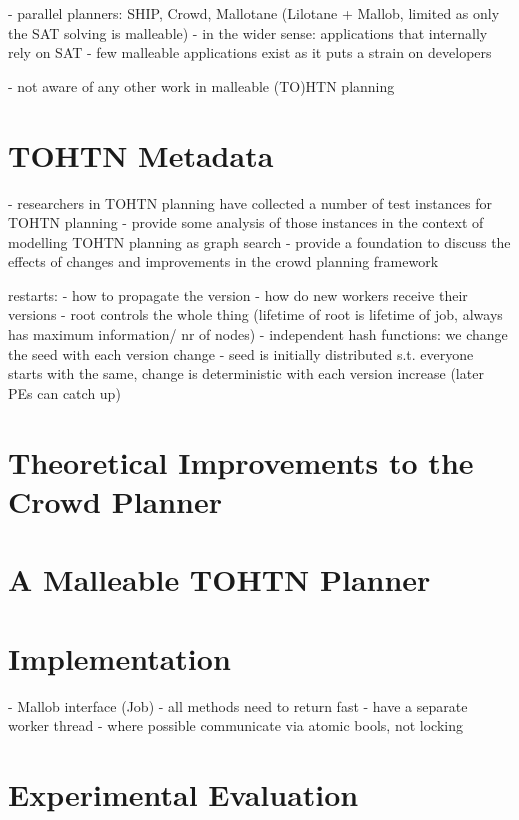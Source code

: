 \documentclass[enabledeprecatedfontcommands,12pt,a4paper,twoside]{scrartcl}
\numberwithin{equation}{section}
\begin{document}
- parallel planners: SHIP, Crowd, Mallotane (Lilotane + Mallob, limited as only the SAT solving is malleable)
- in the wider sense: applications that internally rely on SAT
- few malleable applications exist as it puts a strain on developers

- not aware of any other work in malleable (TO)HTN planning

\section{TOHTN Metadata}
- researchers in TOHTN planning have collected a number of test instances for TOHTN planning
- provide some analysis of those instances in the context of modelling TOHTN planning as graph search
- provide a foundation to discuss the effects of changes and improvements in the crowd planning framework

restarts:
- how to propagate the version
- how do new workers receive their versions
- root controls the whole thing (lifetime of root is lifetime of job, always has maximum information/ nr of nodes)
- independent hash functions: we change the seed with each version change
- seed is initially distributed s.t. everyone starts with the same, change is deterministic with each version increase (later PEs can catch up)

\section{Theoretical Improvements to the Crowd Planner}




\section{A Malleable TOHTN Planner}


\section{Implementation}
- Mallob interface (Job)
- all methods need to return fast
- have a separate worker thread
- where possible communicate via atomic bools, not locking



\section{Experimental Evaluation}
\end{document}
